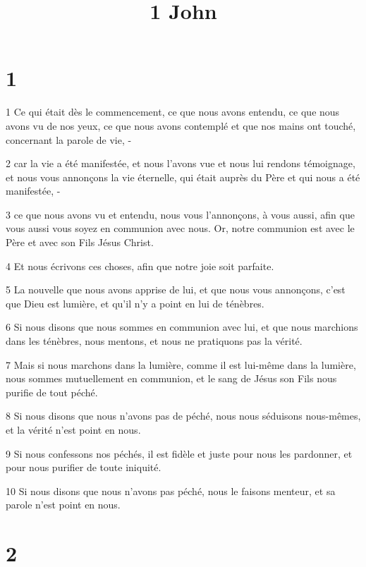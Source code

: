 

\title{1 John}


\chapter{1}

\par 1 Ce qui était dès le commencement, ce que nous avons entendu, ce que nous avons vu de nos yeux, ce que nous avons contemplé et que nos mains ont touché, concernant la parole de vie, -
\par 2 car la vie a été manifestée, et nous l'avons vue et nous lui rendons témoignage, et nous vous annonçons la vie éternelle, qui était auprès du Père et qui nous a été manifestée, -
\par 3 ce que nous avons vu et entendu, nous vous l'annonçons, à vous aussi, afin que vous aussi vous soyez en communion avec nous. Or, notre communion est avec le Père et avec son Fils Jésus Christ.
\par 4 Et nous écrivons ces choses, afin que notre joie soit parfaite.
\par 5 La nouvelle que nous avons apprise de lui, et que nous vous annonçons, c'est que Dieu est lumière, et qu'il n'y a point en lui de ténèbres.
\par 6 Si nous disons que nous sommes en communion avec lui, et que nous marchions dans les ténèbres, nous mentons, et nous ne pratiquons pas la vérité.
\par 7 Mais si nous marchons dans la lumière, comme il est lui-même dans la lumière, nous sommes mutuellement en communion, et le sang de Jésus son Fils nous purifie de tout péché.
\par 8 Si nous disons que nous n'avons pas de péché, nous nous séduisons nous-mêmes, et la vérité n'est point en nous.
\par 9 Si nous confessons nos péchés, il est fidèle et juste pour nous les pardonner, et pour nous purifier de toute iniquité.
\par 10 Si nous disons que nous n'avons pas péché, nous le faisons menteur, et sa parole n'est point en nous.

\chapter{2}

